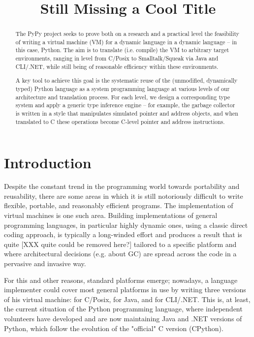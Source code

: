 \documentclass{acm_proc_article-sp}
\begin{document}
\title{Still Missing a Cool Title}


\maketitle

\begin{abstract}
The PyPy project seeks to prove both on a research and a
practical level the feasibility of writing a virtual machine (VM)
for a dynamic language in a dynamic language -- in this case, Python.
The aim is to translate (i.e. compile) the VM to arbitrary target
environments, ranging in level from C/Posix to Smalltalk/Squeak via
Java and CLI/.NET, while still being of reasonable efficiency within
these environments.

A key tool to achieve this goal is the systematic reuse of the
(unmodified, dynamically typed) Python language as a system
programming language at various levels of our architecture and
translation process.  For each level, we design a corresponding type
system and apply a generic type inference engine -- for example, the
garbage collector is written in a style that manipulates
simulated pointer and address objects, and when translated to C
these operations become C-level pointer and address instructions.
\end{abstract}

\section{Introduction}

Despite the constant trend in the programming world towards
portability and reusability, there are some areas in which it is still
notoriously difficult to write flexible, portable, and reasonably
efficient programs.  The implementation of virtual machines is one
such area.  Building implementations of general programming languages,
in particular highly dynamic ones, using a classic direct coding
approach, is typically a long-winded effort and produces a result that
is quite [XXX quite could be removed here?] tailored to a specific
platform and where architectural decisions (e.g. about GC) are spread
across the code in a pervasive and invasive way.

For this and other reasons, standard platforms emerge; nowadays, a
language implementer could cover most general platforms in use by
writing three versions of his virtual machine: for C/Posix, for Java,
and for CLI/.NET.  This is, at least, the current situation of the
Python programming language, where independent volunteers have
developed and are now maintaining Java and .NET versions of Python,
which follow the evolution of the "official" C version (CPython).
\end{document}
